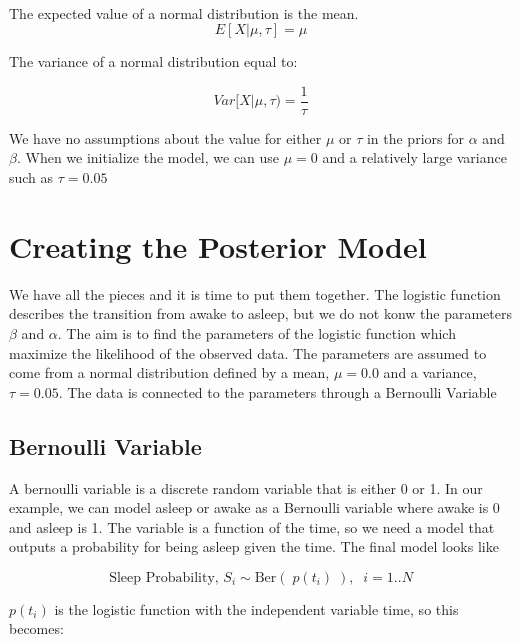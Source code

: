 \documentclass[12pt]{article}
\begin{document}
    \begin{center}
    \end{center}
    { \hspace*{\fill} \\}
    
    The expected value of a normal distribution is the mean.
\[ E[ X | \mu, \tau] = \mu\]

The variance of a normal distribution equal to:

\[ Var[ X | \mu, \tau) = \frac{1}{\tau}\]

We have no assumptions about the value for either \(\mu\) or \(\tau\) in
the priors for \(\alpha\) and \(\beta\). When we initialize the model,
we can use \(\mu = 0\) and a relatively large variance such as
\(\tau = 0.05\)

    \section{Creating the Posterior
Model}\label{creating-the-posterior-model}

We have all the pieces and it is time to put them together. The logistic
function describes the transition from awake to asleep, but we do not
konw the parameters \(\beta\) and \(\alpha\). The aim is to find the
parameters of the logistic function which maximize the likelihood of the
observed data. The parameters are assumed to come from a normal
distribution defined by a mean, \(\mu = 0.0\) and a variance,
\(\tau = 0.05\). The data is connected to the parameters through a
Bernoulli Variable

\subsection{Bernoulli Variable}\label{bernoulli-variable}

A bernoulli variable is a discrete random variable that is either 0 or
1. In our example, we can model asleep or awake as a Bernoulli variable
where awake is 0 and asleep is 1. The variable is a function of the
time, so we need a model that outputs a probability for being asleep
given the time. The final model looks like

\[ \text{Sleep Probability, $S_i$} \sim \text{Ber}( \;p(t_i)\; ), \;\; i=1..N\]

\(p(t_i)\) is the logistic function with the independent variable time,
so this becomes:
\end{document}
